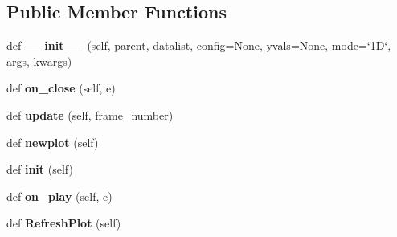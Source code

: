 \subsection*{Public Member Functions}
\begin{DoxyCompactItemize}
\item 
\hypertarget{class_uni_dec_1_1unidec__modules_1_1_plot_animations_1_1_animation_window_a6be671b8aca4d1fffbbaa8074e9aba77}{}def {\bfseries \+\_\+\+\_\+init\+\_\+\+\_\+} (self, parent, datalist, config=None, yvals=None, mode=\char`\"{}1\+D\char`\"{}, args, kwargs)\label{class_uni_dec_1_1unidec__modules_1_1_plot_animations_1_1_animation_window_a6be671b8aca4d1fffbbaa8074e9aba77}

\item 
\hypertarget{class_uni_dec_1_1unidec__modules_1_1_plot_animations_1_1_animation_window_af98238c99135868ad17e3713a62a915d}{}def {\bfseries on\+\_\+close} (self, e)\label{class_uni_dec_1_1unidec__modules_1_1_plot_animations_1_1_animation_window_af98238c99135868ad17e3713a62a915d}

\item 
\hypertarget{class_uni_dec_1_1unidec__modules_1_1_plot_animations_1_1_animation_window_adfb2d11edabd6a3914eb1ee3d938c7e3}{}def {\bfseries update} (self, frame\+\_\+number)\label{class_uni_dec_1_1unidec__modules_1_1_plot_animations_1_1_animation_window_adfb2d11edabd6a3914eb1ee3d938c7e3}

\item 
\hypertarget{class_uni_dec_1_1unidec__modules_1_1_plot_animations_1_1_animation_window_a1956d5174b29c0446508a73c098b8a7f}{}def {\bfseries newplot} (self)\label{class_uni_dec_1_1unidec__modules_1_1_plot_animations_1_1_animation_window_a1956d5174b29c0446508a73c098b8a7f}

\item 
\hypertarget{class_uni_dec_1_1unidec__modules_1_1_plot_animations_1_1_animation_window_a032cc6e24a7f1c17cf42899f9b294ad8}{}def {\bfseries init} (self)\label{class_uni_dec_1_1unidec__modules_1_1_plot_animations_1_1_animation_window_a032cc6e24a7f1c17cf42899f9b294ad8}

\item 
\hypertarget{class_uni_dec_1_1unidec__modules_1_1_plot_animations_1_1_animation_window_a548589017a9270cf59ad2c99c1969c51}{}def {\bfseries on\+\_\+play} (self, e)\label{class_uni_dec_1_1unidec__modules_1_1_plot_animations_1_1_animation_window_a548589017a9270cf59ad2c99c1969c51}

\item 
\hypertarget{class_uni_dec_1_1unidec__modules_1_1_plot_animations_1_1_animation_window_aef753361a0d5bd68123a481316e7a1f5}{}def {\bfseries Refresh\+Plot} (self)\label{class_uni_dec_1_1unidec__modules_1_1_plot_animations_1_1_animation_window_aef753361a0d5bd68123a481316e7a1f5}


\end{DoxyCompactItemize}
